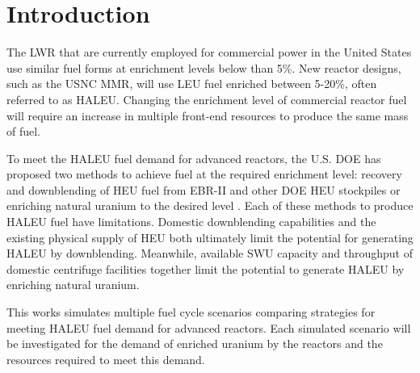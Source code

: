 \section{Introduction}
The \gls{LWR} that are currently employed for commercial power in the 
United States use similar fuel forms at enrichment levels 
below than 5\%. New reactor designs, such as the \gls{USNC} \gls{MMR}, will 
use \gls{LEU} fuel enriched between 5-20\%, often referred to as \gls{HALEU}.
Changing the enrichment level of commercial reactor fuel will require 
an increase in multiple front-end resources to produce the same mass of fuel. 

To meet the \gls{HALEU} fuel demand for advanced reactors, the U.S. 
\gls{DOE} has proposed two methods to achieve fuel at the 
required enrichment level: recovery and downblending of \gls{HEU} fuel 
from EBR-II and other \gls{DOE} \gls{HEU} stockpiles or enriching natural 
uranium to the desired level \cite{griffith_overview_2020}. Each of these 
methods to produce \gls{HALEU} fuel have limitations. Domestic downblending 
capabilities and the existing physical supply of \gls{HEU} both ultimately 
limit the potential for generating \gls{HALEU} by downblending. Meanwhile, 
available \gls{SWU} capacity and throughput of domestic centrifuge 
facilities together limit the potential to generate \gls{HALEU} by 
enriching natural uranium. 

This works simulates multiple fuel cycle scenarios comparing strategies
for meeting \gls{HALEU} fuel demand for advanced reactors. Each simulated 
scenario will be investigated for the demand of enriched uranium by the 
reactors and the resources required to meet this demand. 